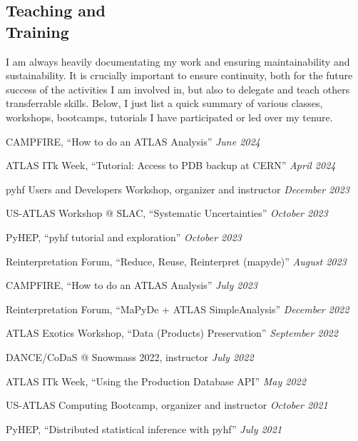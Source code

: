 \documentclass[margin,line]{resume}
\let\origsection\section%
\let\section\subsection%
\let\section\origsection%
\begin{document}
\begin{resume}

\section{\mysidestyle Teaching and\\Training}
I am always heavily documentating my work and ensuring maintainability and sustainability. It is crucially important to ensure continuity, both for the future success of the activities I am involved in, but also to delegate and teach others transferrable skills. Below, I just list a quick summary of various classes, workshops, bootcamps, tutorials I have participated or led over my tenure.
\begin{list2}
  \item CAMPFIRE, ``How to do an ATLAS Analysis'' \hfill \textsl{June 2024}
  \item ATLAS ITk Week, ``Tutorial: Access to PDB backup at CERN'' \hfill \textsl{April 2024}
  \item pyhf Users and Developers Workshop, organizer and instructor \hfill \textsl{December 2023}
  \item US-ATLAS Workshop @ SLAC, ``Systematic Uncertainties'' \hfill \textsl{October 2023}
  \item PyHEP, ``pyhf tutorial and exploration'' \hfill \textsl{October 2023}
  \item Reinterpretation Forum, ``Reduce, Reuse, Reinterpret (mapyde)'' \hfill \textsl{August 2023}
  \item CAMPFIRE, ``How to do an ATLAS Analysis'' \hfill \textsl{July 2023}
  \item Reinterpretation Forum, ``MaPyDe + ATLAS SimpleAnalysis'' \hfill \textsl{December 2022}
  \item ATLAS Exotics Workshop, ``Data (Products) Preservation'' \hfill \textsl{September 2022}
  \item DANCE/CoDaS @ Snowmass 2022, instructor \hfill \textsl{July 2022}
  \item ATLAS ITk Week, ``Using the Production Database API'' \hfill \textsl{May 2022}
  \item US-ATLAS Computing Bootcamp, organizer and instructor \hfill \textsl{October 2021}
  \item PyHEP, ``Distributed statistical inference with pyhf'' \hfill \textsl{July 2021}

\end{list2}
\end{resume}
\end{document}
